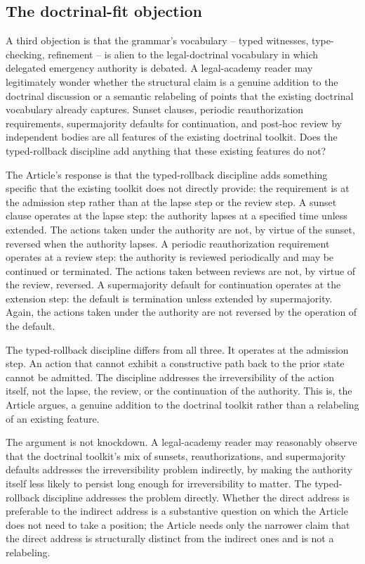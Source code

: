 \subsection{The doctrinal-fit objection}

A third objection is that the grammar's vocabulary -- typed witnesses, type-checking, refinement --
is alien to the legal-doctrinal vocabulary in which delegated emergency authority is debated.
A legal-academy reader may legitimately wonder whether the structural claim is a genuine addition to the doctrinal
discussion or a semantic relabeling of points that the existing doctrinal vocabulary already captures.
Sunset clauses, periodic reauthorization requirements, supermajority defaults for continuation,
and post-hoc review by independent bodies are all features of the existing doctrinal toolkit.
Does the typed-rollback discipline add anything that these existing features do not?

The Article's response is that the typed-rollback discipline adds something specific that the existing toolkit
does not directly provide:
the requirement is at the admission step rather than at the lapse step or the review step.
A sunset clause operates at the lapse step:
the authority lapses at a specified time unless extended.
The actions taken under the authority are not, by virtue of the sunset, reversed when the authority lapses.
A periodic reauthorization requirement operates at a review step:
the authority is reviewed periodically and may be continued or terminated.
The actions taken between reviews are not, by virtue of the review, reversed.
A supermajority default for continuation operates at the extension step:
the default is termination unless extended by supermajority.
Again, the actions taken under the authority are not reversed by the operation of the default.

The typed-rollback discipline differs from all three.
It operates at the admission step.
An action that cannot exhibit a constructive path back to the prior state cannot be admitted.
The discipline addresses the irreversibility of the action itself, not the lapse, the review, or the continuation of the authority.
This is, the Article argues, a genuine addition to the doctrinal toolkit rather than a relabeling of an existing feature.

The argument is not knockdown.
A legal-academy reader may reasonably observe that the doctrinal toolkit's mix of sunsets, reauthorizations,
and supermajority defaults addresses the irreversibility problem indirectly,
by making the authority itself less likely to persist long enough for irreversibility to matter.
The typed-rollback discipline addresses the problem directly.
Whether the direct address is preferable to the indirect address is a substantive question on which the Article
does not need to take a position;
the Article needs only the narrower claim that the direct address is structurally distinct from the indirect ones
and is not a relabeling.

